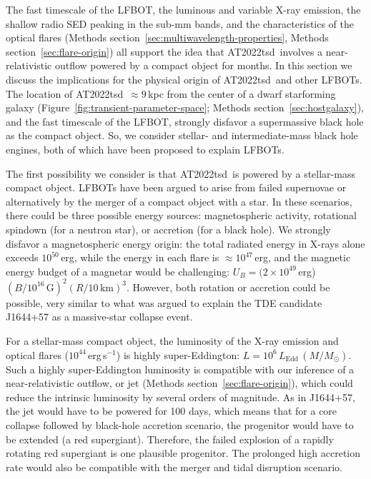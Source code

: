 \documentclass{nature_plusfigure}
\newcommand{\at}{AT2022tsd}
\begin{document}
\begin{methods}
The fast timescale of the LFBOT, the luminous and variable X-ray emission, the shallow radio SED peaking in the sub-mm bands, and the characteristics of the optical flares (Methods section~\ref{sec:multiwavelength-properties}, Methods section~\ref{sec:flare-origin}) all support the idea that \at\ involves a near-relativistic outflow powered by a compact object for months. In this section we discuss the implications for the physical origin of \at\ and other LFBOTs. The location of \at\ $\approx9\,$kpc from the center of a dwarf starforming galaxy (Figure~\ref{fig:transient-parameter-space}; Methods section~\ref{sec:hostgalaxy}), and the fast timescale of the LFBOT, strongly disfavor a supermassive black hole as the compact object. So, we consider stellar- and intermediate-mass black hole engines, both of which have been proposed to explain LFBOTs\cite{Perley2019,Margutti2019,Metzger2022,Chen2023}. 

The first possibility we consider is that \at\ is powered by a stellar-mass compact object. LFBOTs have been argued to arise from failed supernovae\cite{Perley2019,Margutti2019} or alternatively by the merger of a compact object with a star\cite{Metzger2022}. In these scenarios, there could be three possible energy sources: magnetospheric activity, rotational spindown (for a neutron star), or accretion (for a black hole). We strongly disfavor a magnetospheric energy origin: the total radiated energy in X-rays alone exceeds $10^{50}\,$erg, while the energy in each flare is $\approx10^{47}\,$erg, and the magnetic energy budget of a magnetar would be challenging: $U_B = (2\times10^{49}\,$erg)$(B/10^{16}\,\mathrm{G})^2 (R/10\,\mathrm{km})^3$. However, both rotation or accretion could be possible, very similar to what was argued to explain the TDE candidate J1644+57 as a massive-star collapse event\cite{Quataert2012}. 

For a stellar-mass compact object, the luminosity of the X-ray emission and optical flares ($10^{44}\,$erg\,s$^{-1}$) is highly super-Eddington: $L=10^{6}\,L_\mathrm{Edd}\,(M/M_\odot)$. Such a highly super-Eddington luminosity is compatible with our inference of a near-relativistic outflow, or jet (Methods section~\ref{sec:flare-origin}), which could reduce the intrinsic luminosity by several orders of magnitude. As in J1644+57, the jet would have to be powered for 100 days, which means that for a core collapse followed by black-hole accretion scenario, the progenitor would have to be extended (a red supergiant\cite{Quataert2012}). Therefore, the failed explosion of a rapidly rotating red supergiant is one plausible progenitor. The prolonged high accretion rate would also be compatible with the merger and tidal disruption scenario\cite{Metzger2022}.


\end{methods}
\end{document}
